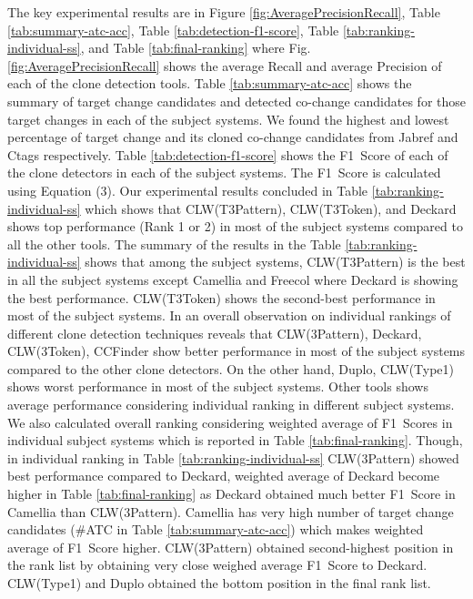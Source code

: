 \documentclass[review]{elsarticle}
\begin{document}
The key experimental results are in Figure \ref{fig:AveragePrecisionRecall}, Table \ref{tab:summary-atc-acc}, Table \ref{tab:detection-f1-score}, Table \ref{tab:ranking-individual-ss}, and Table \ref{tab:final-ranking} where Fig. \ref{fig:AveragePrecisionRecall} shows the average Recall and average Precision of each of the clone detection tools. Table \ref{tab:summary-atc-acc} shows the summary of target change candidates and detected co-change candidates for those target changes in each of the subject systems.  We found the highest and lowest percentage of target change and its cloned co-change candidates from Jabref and Ctags respectively. Table \ref{tab:detection-f1-score} shows the F1~Score of each of the clone detectors in each of the subject systems. The F1~Score is calculated using Equation (3). Our experimental results concluded in Table \ref{tab:ranking-individual-ss} which shows that CLW(T3Pattern), CLW(T3Token), and Deckard shows top performance (Rank 1 or 2) in most of the subject systems compared to all the other tools. The summary of the results in the Table \ref{tab:ranking-individual-ss} shows that among the subject systems, CLW(T3Pattern) is the best in all the subject systems except Camellia and Freecol where Deckard is showing the best performance. CLW(T3Token) shows the second-best performance in most of the subject systems. In an overall observation on individual rankings of different clone detection techniques reveals that CLW(3Pattern), Deckard, CLW(3Token), CCFinder show better performance in most of the subject systems compared to the other clone detectors. On the other hand, Duplo, CLW(Type1) shows worst performance in most of the subject systems. Other tools shows average performance considering individual ranking in different subject systems. We also calculated overall ranking considering weighted average of F1~Scores in individual subject systems which is reported in Table \ref{tab:final-ranking}. Though, in individual ranking in Table \ref{tab:ranking-individual-ss} CLW(3Pattern) showed best performance compared to Deckard, weighted average of Deckard become higher in Table \ref{tab:final-ranking} as Deckard obtained much better F1~Score in Camellia than CLW(3Pattern). Camellia has very high number of target change candidates (\#ATC in Table \ref{tab:summary-atc-acc}) which makes weighted average of F1~Score higher. CLW(3Pattern) obtained second-highest position in the rank list by obtaining very close weighed average F1~Score to Deckard. CLW(Type1) and Duplo obtained the bottom position in the final rank list. 
\end{document}

